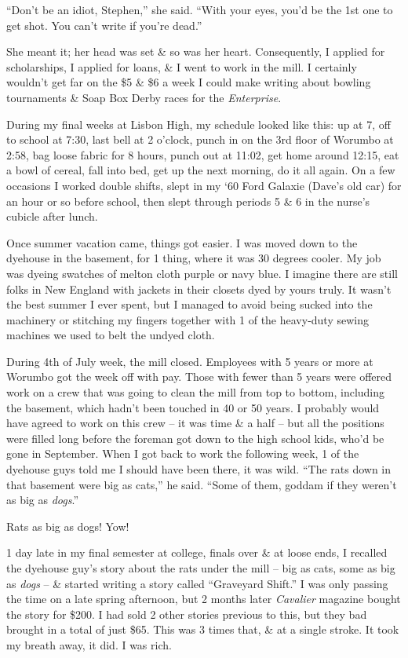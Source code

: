 \documentclass{article}
\numberwithin{equation}{section}
\begin{document}
``Don't be an idiot, Stephen,'' she said. ``With your eyes, you'd be the 1st one to get shot. You can't write if you're dead.''

She meant it; her head was set \& so was her heart. Consequently, I applied for scholarships, I applied for loans, \& I went to work in the mill. I certainly wouldn't get far on the \$5 \& \$6 a week I could make writing about bowling tournaments \& Soap Box Derby races for the \textit{Enterprise}.

During my final weeks at Lisbon High, my schedule looked like this: up at 7, off to school at 7:30, last bell at 2 o'clock, punch in on the 3rd floor of Worumbo at 2:58, bag loose fabric for 8 hours, punch out at 11:02, get home around 12:15, eat a bowl of cereal, fall into bed, get up the next morning, do it all again. On a few occasions I worked double shifts, slept in my `60 Ford Galaxie (Dave's old car) for an hour or so before school, then slept through periods 5 \& 6 in the nurse's cubicle after lunch.

Once summer vacation came, things got easier. I was moved down to the dyehouse in the basement, for 1 thing, where it was 30 degrees cooler. My job was dyeing swatches of melton cloth purple or navy blue. I imagine there are still folks in New England with jackets in their closets dyed by yours truly. It wasn't the best summer I ever spent, but I managed to avoid being sucked into the machinery or stitching my fingers together with 1 of the heavy-duty sewing machines we used to belt the undyed cloth.

During 4th of July week, the mill closed. Employees with 5 years or more at Worumbo got the week off with pay. Those with fewer than 5 years were offered work on a crew that was going to clean the mill from top to bottom, including the basement, which hadn't been touched in 40 or 50 years. I probably would have agreed to work on this crew -- it was time \& a half -- but all the positions were filled long before the foreman got down to the high school kids, who'd be gone in September. When I got back to work the following week, 1 of the dyehouse guys told me I should have been there, it was wild. ``The rats down in that basement were big as cats,'' he said. ``Some of them, goddam if they weren't as big as \textit{dogs}.''

Rats as big as dogs! Yow!

1 day late in my final semester at college, finals over \& at loose ends, I recalled the dyehouse guy's story about the rats under the mill -- big as cats, some as big as \textit{dogs} -- \& started writing a story called ``Graveyard Shift.'' I was only passing the time on a late spring afternoon, but 2 months later \textit{Cavalier} magazine bought the story for \$200. I had sold 2 other stories previous to this, but they bad brought in a total of just \$65. This was 3 times that, \& at a single stroke. It took my breath away, it did. I was rich.
\end{document}
